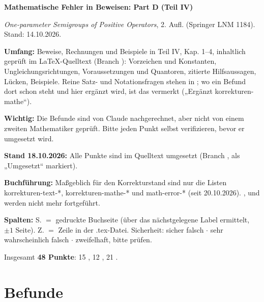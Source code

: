\documentclass[10pt]{article}
\begin{document}
{\Large\bfseries Mathematische Fehler in Beweisen: Part D (Teil IV)\par}
\smallskip
\emph{One-parameter Semigroups of Positive Operators}, 2. Aufl. (Springer LNM 1184). Stand: 14.10.2026.

\textbf{Umfang:} Beweise, Rechnungen und Beispiele in Teil IV, Kap. 1–4, inhaltlich geprüft im LaTeX-Quelltext (Branch ): Vorzeichen und Konstanten, Ungleichungsrichtungen, Voraussetzungen und Quantoren, zitierte Hilfsaussagen, Lücken, Beispiele. Reine Satz- und Notationsfragen stehen in ; wo ein Befund dort schon steht und hier ergänzt wird, ist das vermerkt („Ergänzt korrekturen-mathe“).

\textbf{Wichtig:} Die Befunde sind von Claude nachgerechnet, aber nicht von einem zweiten Mathematiker geprüft. Bitte jeden Punkt selbst verifizieren, bevor er umgesetzt wird.

\textbf{Stand 18.10.2026:} Alle Punkte sind im Quelltext umgesetzt (Branch , als „Umgesetzt“ markiert).

\textbf{Buchführung:} Maßgeblich für den Korrekturstand sind nur die Listen {korrekturen-text-*}, {korrekturen-mathe-*} und {math-error-*} (seit 20.10.2026). ,  und  werden nicht mehr fortgeführt.

\textbf{Spalten:} S. $=$ gedruckte Buchseite (über das nächstgelegene Label ermittelt, $\ensuremath{\pm}1$ Seite). Z. $=$ Zeile in der .tex-Datei. Sicherheit: \sichA{} sicher falsch $\ensuremath{\cdot}$ \sichB{} sehr wahrscheinlich falsch $\ensuremath{\cdot}$ \sichC{} zweifelhaft, bitte prüfen.

Insgesamt \textbf{48 Punkte}: 15 \sichA{}, 12 \sichB{}, 21 \sichC{}.

\section*{Befunde}
\end{document}
